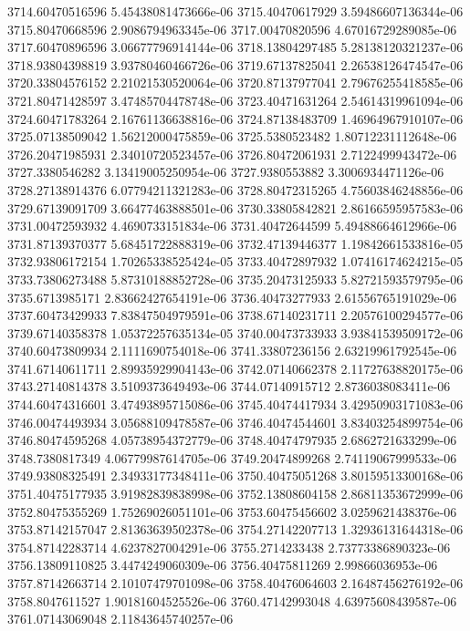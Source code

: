 {3714.60470516596 5.45438081473666e-06
3715.40470617929 3.59486607136344e-06
3715.80470668596 2.9086794963345e-06
3717.00470820596 4.67016729289085e-06
3717.60470896596 3.06677796914144e-06
3718.13804297485 5.28138120321237e-06
3718.93804398819 3.93780460466726e-06
3719.67137825041 2.26538126474547e-06
3720.33804576152 2.21021530520064e-06
3720.87137977041 2.79676255418585e-06
3721.80471428597 3.47485704478748e-06
3723.40471631264 2.54614319961094e-06
3724.60471783264 2.16761136638816e-06
3724.87138483709 1.46964967910107e-06
3725.07138509042 1.56212000475859e-06
3725.5380523482 1.80712231112648e-06
3726.20471985931 2.34010720523457e-06
3726.80472061931 2.7122499943472e-06
3727.3380546282 3.13419005250954e-06
3727.9380553882 3.3006934471126e-06
3728.27138914376 6.07794211321283e-06
3728.80472315265 4.75603846248856e-06
3729.67139091709 3.66477463888501e-06
3730.33805842821 2.86166595957583e-06
3731.00472593932 4.4690733151834e-06
3731.40472644599 5.49488664612966e-06
3731.87139370377 5.68451722888319e-06
3732.47139446377 1.19842661533816e-05
3732.93806172154 1.70265338525424e-05
3733.40472897932 1.07416174624215e-05
3733.73806273488 5.87310188852728e-06
3735.20473125933 5.82721593579795e-06
3735.6713985171 2.83662427654191e-06
3736.40473277933 2.61556765191029e-06
3737.60473429933 7.83847504979591e-06
3738.67140231711 2.20576100294577e-06
3739.67140358378 1.05372257635134e-05
3740.00473733933 3.93841539509172e-06
3740.60473809934 2.1111690754018e-06
3741.33807236156 2.63219961792545e-06
3741.67140611711 2.89935929904143e-06
3742.07140662378 2.11727638820175e-06
3743.27140814378 3.5109373649493e-06
3744.07140915712 2.8736038083411e-06
3744.60474316601 3.47493895715086e-06
3745.40474417934 3.42950903171083e-06
3746.00474493934 3.05688109478587e-06
3746.40474544601 3.83403254899754e-06
3746.80474595268 4.05738954372779e-06
3748.40474797935 2.6862721633299e-06
3748.7380817349 4.06779987614705e-06
3749.20474899268 2.74119067999533e-06
3749.93808325491 2.34933177348411e-06
3750.40475051268 3.80159513300168e-06
3751.40475177935 3.91982839838998e-06
3752.13808604158 2.86811353672999e-06
3752.80475355269 1.75269026051101e-06
3753.60475456602 3.0259621438376e-06
3753.87142157047 2.81363639502378e-06
3754.27142207713 1.32936131644318e-06
3754.87142283714 4.6237827004291e-06
3755.2714233438 2.73773386890323e-06
3756.13809110825 3.4474249060309e-06
3756.40475811269 2.99866036953e-06
3757.87142663714 2.10107479701098e-06
3758.40476064603 2.16487456276192e-06
3758.8047611527 1.90181604525526e-06
3760.47142993048 4.63975608439587e-06
3761.07143069048 2.11843645740257e-06
}

